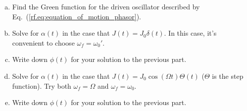 


\begin{enumerate}[a)]
  \item Find the Green function for the driven oscillator described by Eq.~(\ref{rf.eq:equation_of_motion_phasor}).
  \item Solve for $\alpha(t)$ in the case that $J(t) = J_0 \delta(t)$. In this case, it's convenient to choose $\omega_f = \omega_0'$.
  \item Write down $\phi(t)$ for your solution to the previous part.
  \item Solve for $\alpha(t)$ in the case that $J(t) = J_0 \cos(\Omega t)\Theta(t)$ ($\Theta$ is the step function). Try both $\omega_f = \Omega$ and $\omega_f = \omega_0$.
  \item Write down $\phi(t)$ for your solution to the previous part.
\end{enumerate}

